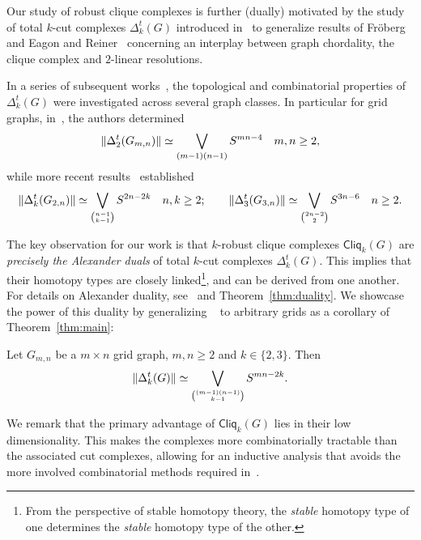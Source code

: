 \documentclass[a4paper, v2021]{lipics-v2021}
\theoremstyle{plain}
\theoremstyle{definition}
\newcommand{\Cliq}[2]{\mathsf{Cliq}_{#1}(#2)}
\DeclarePairedDelimiter{\gr}{\lVert}{\rVert}
\begin{document}
Our study of robust clique complexes is further (dually) motivated by the study of total $k$-cut complexes $\Delta^t_k(G)$ introduced in~\cite{BayerDJRSX24} to generalize results of Fröberg~\cite[Theorem~1]{Froberg1990} and Eagon and Reiner~\cite[Proposition~1]{EagonReiner1998} concerning an interplay between graph chordality, the clique complex and $2$-linear resolutions.

 In a series of subsequent works~\cite{BayerDMJRSX24,BayerDMJSX25,ChandrakarHRS24,ShenSYZZ25}, the topological and combinatorial properties of $\Delta^t_k(G)$ were investigated across several graph classes. In particular for grid graphs, in~\cite[Theorem~4.16]{BayerDJRSX24}, the authors determined 
 \[
\gr{\Delta_2^t (G_{m,n})} \simeq \bigvee_{{(m-1)(n-1)}} S^{mn-4} \quad m,n\geq2,
\]
while more recent results~\cite[Theorem~1.1]{ChandrakarHRS24} established
\[
\gr{\Delta_k^t (G_{2,n})} \simeq \bigvee_{\binom {n-1}{k-1}} S^{2n-2k} \quad n,k\geq2; \qquad \gr{\Delta_3^t (G_{3,n})} \simeq \bigvee_{\binom {2n-2}{2}} S^{3n-6}\quad n\geq2.
\]

The key observation for our work is that $k$-robust clique complexes $\Cliq{k}{G}$ are \emph{precisely the Alexander duals} of total $k$-cut complexes $\Delta_k^t(G)$. This implies that their homotopy types are closely linked\footnote{From the perspective of stable homotopy theory, the \emph{stable} homotopy type of one determines the \emph{stable} homotopy type of the other.}, and can be derived from one another. For details on Alexander duality, see~\cite{BjornerT09} and Theorem~\ref{thm:duality}. We showcase the power of this duality by generalizing ~\cite[Theorem~1.1]{ChandrakarHRS24} to arbitrary grids as a corollary of Theorem~\ref{thm:main}:
\begin{corollary}\label{thm:TotalCutMain}
Let $G_{m,n}$ be a  $m \times n$ grid graph, $m, n \geq 2$ and $k\in \{2,3\}$. Then
\[
\gr{\Delta_k^t (G)} \simeq \bigvee_{
    \binom{(m-1)(n-1)}{k-1}} S^{mn - 2k}.
\]
\end{corollary}

We remark that the primary advantage of $\Cliq{k}{G}$ lies in their low dimensionality. This makes the complexes more combinatorially tractable than the associated cut complexes, allowing for an inductive analysis that avoids the more involved combinatorial methods required in~\cite{ChandrakarHRS24}.
\end{document}
